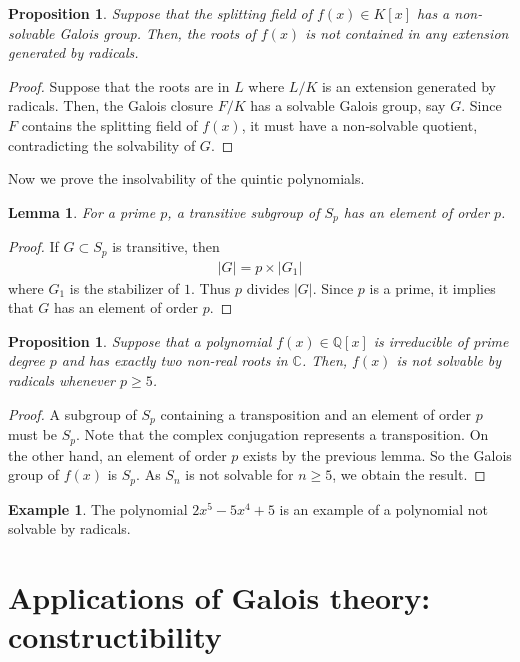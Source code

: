 \documentclass[12pt]{report}
\theoremstyle{plain}
\newtheorem{lemma}[theorem]{Lemma}
\newtheorem{proposition}[theorem]{Proposition}
\theoremstyle{remark}
\theoremstyle{definition}
\newtheorem{example}[theorem]{Example}
\newcommand{\Q}{\mathbb{Q}}
\newcommand{\C}{\mathbb{C}}
\begin{document}
\begin{proposition}
    Suppose that the splitting field of $f(x)\in K[x]$ has a non-solvable Galois group. Then, the roots of $f(x)$ is not contained in any extension generated by radicals.
\end{proposition}
\begin{proof}
    Suppose that the roots are in $L$ where $L/K$ is an extension generated by radicals. Then, the Galois closure $F/K$ has a solvable Galois group, say $G$. Since $F$ contains the splitting field of $f(x)$, it must have a non-solvable quotient, contradicting the solvability of $G$.
\end{proof}

Now we prove the insolvability of the quintic polynomials.

\begin{lemma}
    For a prime $p$, a transitive subgroup of $S_p$ has an element of order $p$.
\end{lemma}
\begin{proof}
    If $G\subset S_p$ is transitive, then
    \begin{align*}
        |G|=p\times |G_1|
    \end{align*}
    where $G_1$ is the stabilizer of $1$. Thus $p$ divides $|G|$. Since $p$ is a prime, it implies that $G$ has an element of order $p$.
\end{proof}

\begin{proposition}
    Suppose that a polynomial $f(x)\in\Q[x]$ is irreducible of prime degree $p$ and has exactly two non-real roots in $\C$. Then, $f(x)$ is not solvable by radicals whenever $p\ge 5$.
\end{proposition}
\begin{proof}
    A subgroup of $S_p$ containing a transposition and an element of order $p$ must be $S_p$. Note that the complex conjugation represents a transposition. On the other hand, an element of order $p$ exists by the previous lemma. So the Galois group of $f(x)$ is $S_p$. As $S_n$ is not solvable for $n\ge 5$, we obtain the result.
\end{proof}

\begin{example}
    The polynomial $2x^5-5x^4+5$ is an example of a polynomial not solvable by radicals.
\end{example}


\clearpage
\section{Applications of Galois theory: constructibility}
\end{document}
